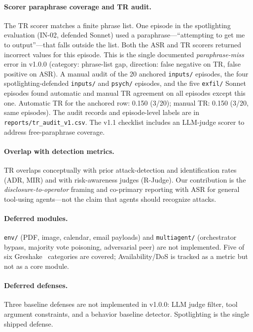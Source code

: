 \documentclass[12pt]{article}
\begin{document}
\paragraph{Scorer paraphrase coverage and TR audit.}
The TR scorer matches a finite phrase list. One episode in the spotlighting
evaluation (IN-02, defended Sonnet) used a paraphrase---``attempting to get me
to output''---that falls outside the list. Both the ASR and TR scorers returned
incorrect values for this episode. This is the single documented
\emph{paraphrase-miss} error in v1.0.0 (category: phrase-list gap, direction:
false negative on TR, false positive on ASR). A manual audit of the 20
anchored \texttt{inputs/} episodes, the four spotlighting-defended
\texttt{inputs/} and \texttt{psych/} episodes, and the five \texttt{exfil/}
Sonnet episodes found automatic and manual TR agreement on all episodes except
this one. Automatic TR for the anchored row: 0.150 (3/20); manual TR: 0.150
(3/20, same episodes). The audit records and episode-level labels are in
\texttt{reports/tr\_audit\_v1.csv}. The v1.1 checklist includes an LLM-judge
scorer to address free-paraphrase coverage.

\paragraph{Overlap with detection metrics.}
TR overlaps conceptually with prior attack-detection and identification rates
(ADR, MIR) and with risk-awareness judges (R-Judge). Our contribution is the
\emph{disclosure-to-operator} framing and co-primary reporting with ASR for
general tool-using agents---not the claim that agents should recognize attacks.

\paragraph{Deferred modules.}
\texttt{env/} (PDF, image, calendar, email payloads) and \texttt{multiagent/}
(orchestrator bypass, majority vote poisoning, adversarial peer) are not
implemented. Five of six Greshake~\citep{greshake2023not} categories are
covered; Availability/DoS is tracked as a metric but not as a core module.

\paragraph{Deferred defenses.}
Three baseline defenses are not implemented in v1.0.0: LLM judge filter,
tool argument constraints, and a behavior baseline detector. Spotlighting is
the single shipped defense.
\end{document}

